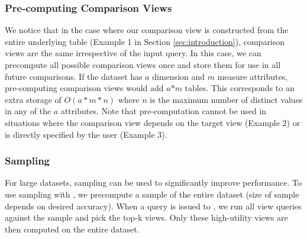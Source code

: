 
 \subsubsection {Pre-computing Comparison Views}
  We notice that in the case where our comparison view is constructed from the
  entire underlying table (Example 1 in Section \ref{sec:introduction}),
  comparison views are the same irrespective of the input query.
  In this case, we can precompute all possible comparison views once and store
  them for use in all future comparisons. If the dataset has $a$ dimension and
  $m$ measure attributes, pre-computing comparison views would add $a$$\ast$$m$
  tables. This corresponds to an extra storage of $O(a\ast m \ast n)$ where $n$
  is the maximum number of distinct values in any of the $a$ attributes. 
  Note that pre-computation cannot be used in situations where the comparison
  view depends on the target view (Example 2) or is directly specified by the
  user (Example 3).
  
\subsubsection {Sampling}
  For large datasets, sampling can be used to significantly improve
  performance. To use sampling with \VizRecDB, we precompute a sample of the
  entire dataset (size of sample depends on desired accuracy). When a query is
  issued to \VizRecDB, we run all view queries against the sample and pick the
  top-k views. Only these high-utility views are then computed on the entire
  dataset. \\


